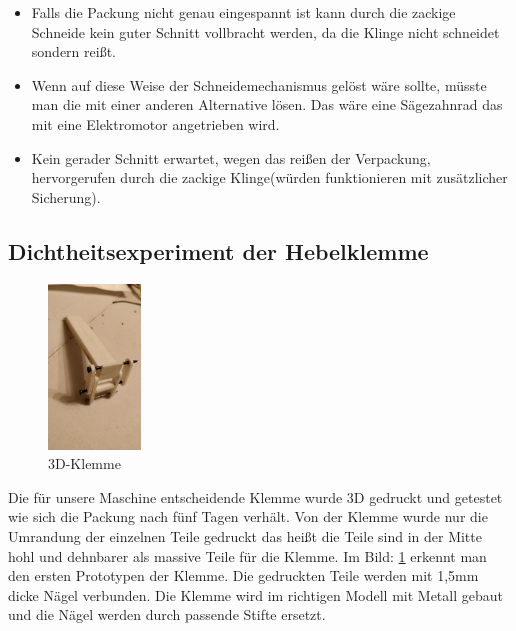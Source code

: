 \begin{itemize}
\item Falls die Packung nicht genau eingespannt ist kann durch die zackige Schneide kein guter Schnitt vollbracht werden, da die Klinge nicht schneidet sondern reißt.
\item Wenn auf diese Weise der Schneidemechanismus gelöst wäre sollte, müsste man die mit einer anderen Alternative lösen. Das wäre eine Sägezahnrad das mit eine Elektromotor angetrieben wird.
\item Kein gerader Schnitt erwartet, wegen das reißen der Verpackung, hervorgerufen durch die zackige Klinge(würden funktionieren mit zusätzlicher Sicherung). 
\end{itemize} 
\newpage
\subsection{Dichtheitsexperiment der Hebelklemme}


\begin{figure}
\vspace{-20pt}
  \begin{center}
    \includegraphics[width=0.22\textwidth]{Bilder/Dichtheitsexperiment/Klemme}
  \end{center}
  \caption{3D-Klemme}
  \label{3D-Klemme}
  \vspace{-20pt}
\end{figure}

Die für unsere Maschine entscheidende Klemme wurde 3D gedruckt und getestet wie sich die Packung nach fünf Tagen verhält. Von der Klemme wurde nur die Umrandung der einzelnen Teile gedruckt das heißt die Teile sind in der Mitte hohl und dehnbarer als massive Teile für die Klemme. Im Bild: \ref{3D-Klemme} erkennt man den ersten Prototypen der Klemme. Die gedruckten Teile werden mit 1,5mm dicke Nägel verbunden. Die Klemme wird im richtigen Modell mit Metall gebaut und die Nägel werden durch passende Stifte ersetzt.\\

